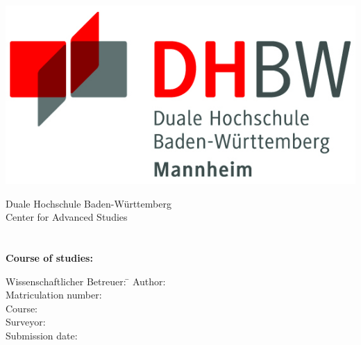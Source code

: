 \begin{titlepage}
    \begin{center}
        \includegraphics{images/logo}
        \vspace{2em}

        {\textsf{\large Duale Hochschule Baden-W\"urttemberg}}\\[1.5mm]
        {\textsf{\large Center for Advanced Studies}}\\[4em]

        {\textsf{\textbf{\large{\TheTypeOfWork}}}}\\[6mm]
        {\textsf{\textbf{\Large{}\TheTitle}}} \\[1.5cm]
        {\textsf{\textbf{\large{}Course of studies: \TheFieldOfStudy}}\\[6mm]}

        \vfill

        \begin{minipage}{\textwidth}
            \begin{tabbing}
                Wissenschaftlicher Betreuer: \hspace{0.85cm}\=\kill
                Author: \> \TheAuthor \\[1.5mm]
                Matriculation number: \> \TheMatriculationNumber \\[1.5mm]
                Course: \> \TheCourse \\[1.5mm]
                Surveyor: \> \TheCourseDirector \\[1.5mm]
                Submission date: \> \TheSubmissionDate \\[1.5mm]
            \end{tabbing}
        \end{minipage}
    \end{center}
\end{titlepage}